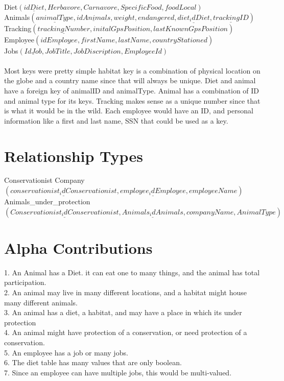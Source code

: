\documentclass[11pt]{article}
\theoremstyle{plain}
\theoremstyle{definition}
\begin{document}
Diet$(\underline{ idDiet}, Herbavore, Carnavore, SpecificFood, foodLocal)$ \\ 

Animals$(\underline{ animalType}, \underline{ idAnimals}, weight, endangered, \underline{diet_idDiet}, \underline{ trackingID})$ \\

Tracking$(\underline{ trackingNumber}, initalGpsPosition, lastKnownGpsPosition)$ \\

Employee$(\underline{ idEmployee}, firstName, lastName, countryStationed)$ \\

Jobs$(\underline{ IdJob}, JobTitle, JobDiscription, EmployeeId)$ \\ \\
Most keys were pretty simple habitat key is a combination of physical location on the globe and a country name since that will always be unique. Diet and animal have a foreign key of animalID and animalType. Animal has a combination of ID and animal type for its keys. Tracking makes sense as a unique number since that is what it would be in the wild.
Each employee would have an ID, and personal information like a first and last name, SSN that could be used as a key.

\section{Relationship Types}
Conservationist Company $(\underline{ conservationist_idConservationist}, \underline{ employee_idEmployee}, employeeName)$ \\

Animals\_under\_protection$(\underline{Conservationist_idConservationist},\underline{Animals_idAnimals}, companyName, AnimalType)$\\ 

\section{Alpha Contributions}
1. An Animal has a Diet. it can eat one to many things, and the animal has total participation.\\
2. An animal may live in many different locations, and a habitat might house many different animals.\\
3. An animal has a diet, a habitat, and may have a place in which its under protection\\
4. An animal might have protection of a conservation, or need protection of a conservation.\\
5. An employee has a job or many jobs.\\
6. The diet table has many values that are only boolean.\\
7. Since an employee can have multiple jobs, this would be multi-valued.\\
\end{document}
